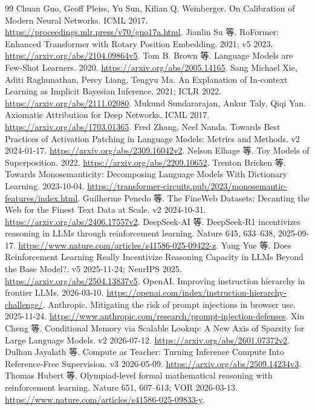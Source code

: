 \begin{thebibliography}{99}
 Chuan Guo, Geoff Pleiss, Yu Sun, Kilian Q. Weinberger. On Calibration of Modern Neural Networks. ICML 2017. \url{https://proceedings.mlr.press/v70/guo17a.html}.
 Jianlin Su 等. RoFormer: Enhanced Transformer with Rotary Position Embedding. 2021; v5 2023. \url{https://arxiv.org/abs/2104.09864v5}.
 Tom B. Brown 等. Language Models are Few-Shot Learners. 2020. \url{https://arxiv.org/abs/2005.14165}.
 Sang Michael Xie, Aditi Raghunathan, Percy Liang, Tengyu Ma. An Explanation of In-context Learning as Implicit Bayesian Inference. 2021; ICLR 2022. \url{https://arxiv.org/abs/2111.02080}.
 Mukund Sundararajan, Ankur Taly, Qiqi Yan. Axiomatic Attribution for Deep Networks. ICML 2017. \url{https://arxiv.org/abs/1703.01365}.
 Fred Zhang, Neel Nanda. Towards Best Practices of Activation Patching in Language Models: Metrics and Methods. v2 2024-01-17. \url{https://arxiv.org/abs/2309.16042v2}.
 Nelson Elhage 等. Toy Models of Superposition. 2022. \url{https://arxiv.org/abs/2209.10652}.
 Trenton Bricken 等. Towards Monosemanticity: Decomposing Language Models With Dictionary Learning. 2023-10-04. \url{https://transformer-circuits.pub/2023/monosemantic-features/index.html}.
 Guilherme Penedo 等. The FineWeb Datasets: Decanting the Web for the Finest Text Data at Scale. v2 2024-10-31. \url{https://arxiv.org/abs/2406.17557v2}.
 DeepSeek-AI 等. DeepSeek-R1 incentivizes reasoning in LLMs through reinforcement learning. Nature 645, 633–638, 2025-09-17. \url{https://www.nature.com/articles/s41586-025-09422-z}.
 Yang Yue 等. Does Reinforcement Learning Really Incentivize Reasoning Capacity in LLMs Beyond the Base Model?. v5 2025-11-24; NeurIPS 2025. \url{https://arxiv.org/abs/2504.13837v5}.
 OpenAI. Improving instruction hierarchy in frontier LLMs. 2026-03-10. \url{https://openai.com/index/instruction-hierarchy-challenge/}.
 Anthropic. Mitigating the risk of prompt injections in browser use. 2025-11-24. \url{https://www.anthropic.com/research/prompt-injection-defenses}.
 Xin Cheng 等. Conditional Memory via Scalable Lookup: A New Axis of Sparsity for Large Language Models. v2 2026-07-12. \url{https://arxiv.org/abs/2601.07372v2}.
 Dulhan Jayalath 等. Compute as Teacher: Turning Inference Compute Into Reference-Free Supervision. v3 2026-05-09. \url{https://arxiv.org/abs/2509.14234v3}.
 Thomas Hubert 等. Olympiad-level formal mathematical reasoning with reinforcement learning. Nature 651, 607–613; VOR 2026-03-13. \url{https://www.nature.com/articles/s41586-025-09833-y}.
\end{thebibliography}
